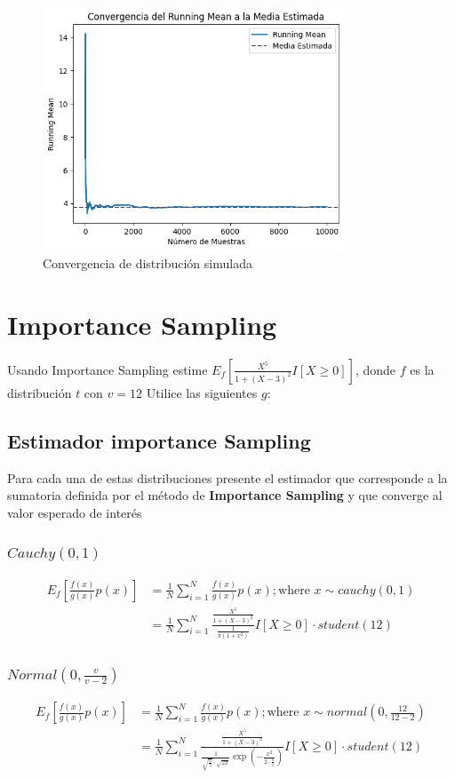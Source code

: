 \documentclass{article}
\begin{document}
\begin{figure}[H]
	\centering
	\includegraphics[width=0.8\textwidth]{assets/gama_sum.png}
	\caption{Convergencia de distribución simulada}
\end{figure}

\section{Importance Sampling}

Usando Importance Sampling estime $E_f\left[ \frac{X^5}{1+(X - 3)^2}I[X \ge 0] \right]$, donde $f$ es la
distribución $t$ con $v=12$ Utilice las siguientes $g$:

\subsection{Estimador importance Sampling}
Para cada una de estas distribuciones presente el estimador que corresponde a la sumatoria definida
por el método de \textbf{Importance Sampling} y que converge al valor esperado de interés
\subsubsection{$Cauchy(0,1)$}
\[
	\begin{split}
		E_f\left[\frac{f(x)}{g(x)}p(x)\right] & = \frac{1}{N}\sum_{i=1}^{N}\frac{f(x)}{g(x)}p(x) ; \text{where } x \sim cauchy(0,1)                             \\
		                                      & = \frac{1}{N}\sum_{i=1}^{N}\frac{\frac{X^5}{1+(X - 3)^2} }{\frac{1}{\pi (1 + x^2)}} I[X \ge 0]\cdot student(12)
	\end{split}
\]
\subsubsection{$Normal(0, \frac{v}{v-2})$}
\[
	\begin{split}
		E_f\left[\frac{f(x)}{g(x)}p(x)\right] & = \frac{1}{N}\sum_{i=1}^{N}\frac{f(x)}{g(x)}p(x) ; \text{where } x \sim normal(0,\frac{12}{12-2})                                                                            \\
		                                      & = \frac{1}{N}\sum_{i=1}^{N}\frac{\frac{X^5}{1+(X - 3)^2} }{\frac{1}{\sqrt{\frac{6}{5}}\cdot {\sqrt{2\pi}}}\exp(-\frac{x^2}{2\cdot\frac{6}{5}})} I[X \ge 0] \cdot student(12)
	\end{split}
\]
\end{document}
